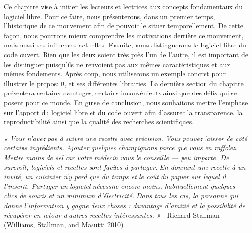\documentclass[
  letterpaper,
]{scrbook}
\begin{document}
Ce chapitre vise à initier les lecteurs et lectrices aux concepts
fondamentaux du logiciel libre. Pour ce faire, nous présenterons, dans
un premier temps, l'historique de ce mouvement afin de pouvoir le situer
temporellement. De cette façon, nous pourrons mieux comprendre les
motivations derrière ce mouvement, mais aussi ses influences actuelles.
Ensuite, nous distinguerons le logiciel libre du code ouvert. Bien que
les deux soient très près l'un de l'autre, il est important de les
distinguer puisqu'ils ne renvoient pas aux mêmes caractéristiques et aux
mêmes fondements. Après coup, nous utiliserons un exemple concret pour
illustrer le propos: \texttt{R}, et ses différentes librairies. La
dernière section du chapitre présentera certains avantages, certains
inconvénients ainsi que des défis qui se posent pour ce monde. En guise
de conclusion, nous souhaitons mettre l'emphase sur l'apport du logiciel
libre et du code ouvert afin d'assurer la transparence, la
reproductibilité ainsi que la qualité des recherches scientifiques.

\emph{« Vous n'avez pas à suivre une recette avec précision. Vous pouvez
laisser de côté certains ingrédients. Ajouter quelques champignons parce
que vous en raffolez. Mettre moins de sel car votre médecin vous le
conseille --- peu importe. De surcroît, logiciels et recettes sont
faciles à partager. En donnant une recette à un invité, un cuisinier n'y
perd que du temps et le coût du papier sur lequel il l'inscrit. Partager
un logiciel nécessite encore moins, habituellement quelques clics de
souris et un minimum d'électricité. Dans tous les cas, la personne qui
donne l'information y gagne deux choses : davantage d'amitié et la
possibilité de récupérer en retour d'autres recettes intéressantes. »} -
Richard Stallman (Williams, Stallman, and Masutti 2010)
\end{document}
